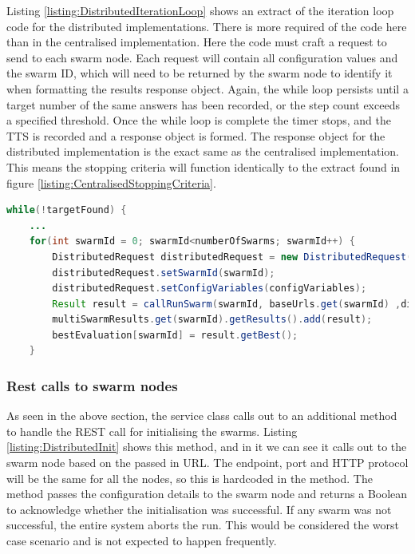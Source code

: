\documentclass[oneside,12pt]{book}
\begin{document}
Listing \ref{listing:DistributedIterationLoop} shows an extract of the iteration loop code for the distributed implementations. There is more required of the code here than in the centralised implementation. Here the code must craft a request to send to each swarm node. Each request will contain all configuration values and the swarm ID, which will need to be returned by the swarm node to identify it when formatting the results response object. Again, the while loop persists until a target number of the same answers has been recorded, or the step count exceeds a specified threshold. Once the while loop is complete the timer stops, and the TTS is recorded and a response object is formed. The response object for the distributed implementation is the exact same as the centralised implementation. This means the stopping criteria will function identically to the extract found in figure \ref{listing:CentralisedStoppingCriteria}.

\begin{lstlisting}[basicstyle=\footnotesize, language=Java]
while(!targetFound) {
    ...
    for(int swarmId = 0; swarmId<numberOfSwarms; swarmId++) {
        DistributedRequest distributedRequest = new DistributedRequest();
        distributedRequest.setSwarmId(swarmId);
        distributedRequest.setConfigVariables(configVariables);
        Result result = callRunSwarm(swarmId, baseUrls.get(swarmId) ,distributedRequest);
        multiSwarmResults.get(swarmId).getResults().add(result);
        bestEvaluation[swarmId] = result.getBest();
    }
\end{lstlisting}
\label{listing:DistributedIterationLoop}

\subsubsection{Rest calls to swarm nodes}
As seen in the above section, the service class calls out to an additional method to handle the REST call for initialising the swarms. Listing \ref{listing:DistributedInit} shows this method, and in it we can see it calls out to the swarm node based on the passed in URL. The endpoint, port and HTTP protocol will be the same for all the nodes, so this is hardcoded in the method. The method passes the configuration details to the swarm node and returns a Boolean to acknowledge whether the initialisation was successful. If any swarm was not successful, the entire system aborts the run. This would be considered the worst case scenario and is not expected to happen frequently. 
\end{document}
